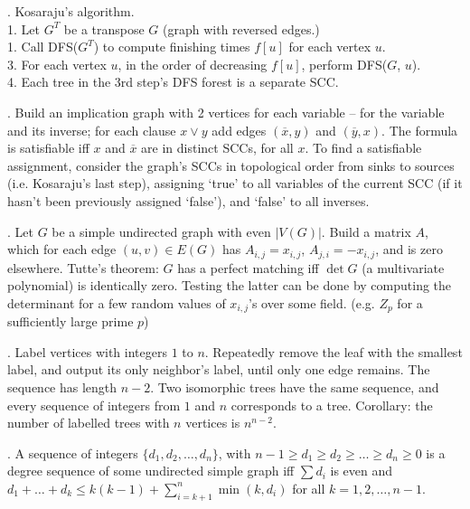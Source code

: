 . Kosaraju's algorithm. \\
1. Let $G^T$ be a transpose $G$ (graph with reversed edges.) \\
1. Call DFS($G^T$) to compute finishing times $f[u]$ for each vertex $u$. \\
3. For each vertex $u$, in the order of decreasing $f[u]$, perform DFS($G$, $u$). \\
4. Each tree in the 3rd step's DFS forest is a separate SCC.

. Build an implication graph with 2 vertices for each
variable -- for the variable and its inverse; for each clause $x \lor y$
add edges $({\overline x}, y)$ and $({\overline y}, x)$.
The formula is satisfiable iff $x$ and ${\overline x}$ are in distinct SCCs,
for all $x$. To find a satisfiable assignment, consider the graph's SCCs
in topological order from sinks to sources (i.e. Kosaraju's last step), assigning `true' to
all variables of the current SCC (if it hasn't been previously
assigned `false'), and `false' to all inverses.

.
Let $G$ be a simple undirected graph with even $|V(G)|$.
Build a matrix $A$, which for each edge $(u,v) \in E(G)$ has
$A_{i,j}=x_{i,j}$, $A_{j,i}=-x_{i,j}$, and is zero elsewhere.
Tutte's theorem: $G$ has a perfect matching iff $\det G$ (a multivariate
polynomial) is identically zero.
Testing the latter can be done by computing the determinant for
a few random values of $x_{i,j}$'s over some field.
(e.g. $Z_p$ for a sufficiently large prime $p$)

.
Label vertices with integers $1$ to $n$.
Repeatedly remove the leaf with the smallest label, and output its only
neighbor's label, until only one edge remains. The sequence has
length $n-2$.  Two isomorphic trees have the same sequence, and every sequence
of integers from $1$ and $n$ corresponds to a tree.
Corollary: the number of labelled trees with $n$ vertices is $n^{n-2}$.  %

.
A sequence of integers $\{ d_1, d_2, \dots, d_n \}$,
with $n-1 \ge d_1 \ge d_2 \ge \dots \ge d_n \ge 0$ is a degree sequence
of some undirected simple graph iff $\sum d_i$ is even and
$d_1 + \dots + d_k \le k(k-1) + \sum_{i=k+1}^n \min(k, d_{i})$
for all $k=1,2,\dots,n-1$.




